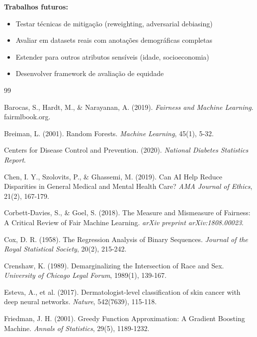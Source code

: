 \documentclass[12pt,a4paper]{article}
\begin{document}
\textbf{Trabalhos futuros:}
\begin{itemize}
    \item Testar técnicas de mitigação (reweighting, adversarial debiasing)
    \item Avaliar em datasets reais com anotações demográficas completas
    \item Estender para outros atributos sensíveis (idade, socioeconomia)
    \item Desenvolver framework de avaliação de equidade
\end{itemize}

\begin{thebibliography}{99}

Barocas, S., Hardt, M., \& Narayanan, A. (2019). \textit{Fairness and 
Machine Learning}. fairmlbook.org.

Breiman, L. (2001). Random Forests. \textit{Machine Learning}, 45(1), 5-32.

Centers for Disease Control and Prevention. (2020). \textit{National Diabetes 
Statistics Report}.

Chen, I. Y., Szolovits, P., \& Ghassemi, M. (2019). Can AI Help Reduce 
Disparities in General Medical and Mental Health Care? \textit{AMA Journal 
of Ethics}, 21(2), 167-179.

Corbett-Davies, S., \& Goel, S. (2018). The Measure and Mismeasure of 
Fairness: A Critical Review of Fair Machine Learning. \textit{arXiv preprint 
arXiv:1808.00023}.

Cox, D. R. (1958). The Regression Analysis of Binary Sequences. \textit{Journal 
of the Royal Statistical Society}, 20(2), 215-242.

Crenshaw, K. (1989). Demarginalizing the Intersection of Race and Sex. 
\textit{University of Chicago Legal Forum}, 1989(1), 139-167.

Esteva, A., et al. (2017). Dermatologist-level classification of skin cancer 
with deep neural networks. \textit{Nature}, 542(7639), 115-118.

Friedman, J. H. (2001). Greedy Function Approximation: A Gradient Boosting 
Machine. \textit{Annals of Statistics}, 29(5), 1189-1232.


\end{thebibliography}
\end{document}
